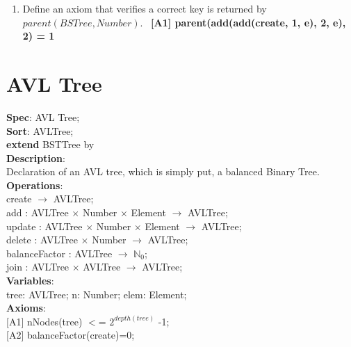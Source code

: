 \documentclass[12pt]{article}
\begin{document}
\begin{spacing}{1.5}
\begin{enumerate}
\item Define an axiom that verifies a correct key is returned by $parent(BSTree, Number)$.\
\hspace*{5mm} \textbf{[A1] parent(add(add(create, 1, e), 2, e), 2) = 1}
\

\end{enumerate}

\newpage

\section*{AVL Tree}

\noindent \textbf{Spec}: AVL Tree;\\
\noindent \textbf{Sort}: AVLTree;\\
\noindent \textbf{extend} BSTTree by\\
\noindent \textbf{Description}:\\Declaration of an AVL tree, which is simply put, a balanced Binary Tree.\\
\noindent \textbf{Operations}:\\
\hspace*{5mm} create $\rightarrow$ AVLTree;\\
\hspace*{5mm} add : AVLTree $\times$ Number $\times$ Element $\rightarrow$ AVLTree;\\
\hspace*{5mm} update : AVLTree $\times$ Number $\times$ Element $\rightarrow$ AVLTree;\\
\hspace*{5mm} delete : AVLTree $\times$ Number $\rightarrow$ AVLTree;\\
\hspace*{5mm} balanceFactor :  AVLTree $\rightarrow$ $\mathbb{N}_0$;\\
\hspace*{5mm} join : AVLTree $\times$ AVLTree $\rightarrow$ AVLTree;\\
\noindent \textbf{Variables}:\\
\hspace*{5mm} tree: AVLTree; n: Number; elem: Element;\\
\noindent \textbf{Axioms}:\\
\hspace*{5mm}[A1] nNodes(tree) $<$= $2^{depth(tree)}$ -1;\\
\hspace*{5mm}[A2] balanceFactor(create)=0;\\




\end{spacing}
\end{document}
